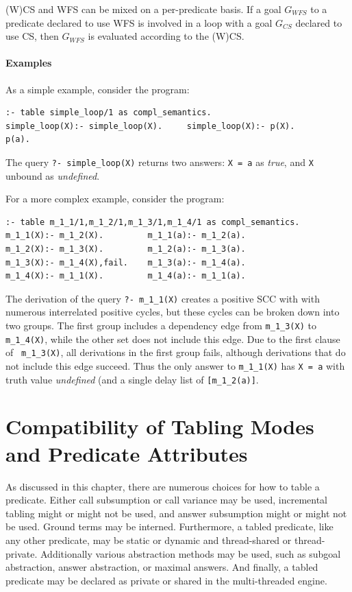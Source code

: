 (W)CS and WFS can be mixed on a per-predicate basis.  If a goal
$G_{WFS}$ to a predicate declared to use WFS is involved in a loop
with a goal $G_{CS}$ declared to use CS, then $G_{WFS}$ is evaluated
according to the (W)CS.

\paragraph{Examples}

As a simple example, consider the program:
\begin{verbatim}
:- table simple_loop/1 as compl_semantics.
simple_loop(X):- simple_loop(X).     simple_loop(X):- p(X).
p(a).
\end{verbatim}
The query {\tt ?- simple\_loop(X)} returns two answers: {\tt X = a} as
{\em true}, and {\tt X} unbound as {\em undefined}.

For a more complex example, consider the program:
\begin{verbatim}
:- table m_1_1/1,m_1_2/1,m_1_3/1,m_1_4/1 as compl_semantics.
m_1_1(X):- m_1_2(X).         m_1_1(a):- m_1_2(a).
m_1_2(X):- m_1_3(X).         m_1_2(a):- m_1_3(a).         
m_1_3(X):- m_1_4(X),fail.    m_1_3(a):- m_1_4(a).
m_1_4(X):- m_1_1(X).         m_1_4(a):- m_1_1(a).
\end{verbatim}
%
The derivation of the query {\tt ?- m\_1\_1(X)} creates a positive SCC
with with numerous interrelated positive cycles, but these cycles can
be broken down into two groups.  The first group includes a dependency
edge from {\tt m\_1\_3(X)} to {\tt m\_1\_4(X)}, while the other set
does not include this edge.  Due to the first clause of {\tt
  m\_1\_3(X)}, all derivations in the first group fails, although
derivations that do not include this edge succeed.  Thus the only
answer to {\tt m\_1\_1(X)} has {\tt X = a} with truth value {\em
  undefined} (and a single delay list of {\tt [m\_1\_2(a)]}.



\section{Compatibility of Tabling Modes and Predicate Attributes} \label{sec:tabling-compatibility}
%
As discussed in this chapter, there are numerous choices for how to
table a predicate. Either call subsumption or call variance may be
used, incremental tabling might or might not be used, and answer
subsumption might or might not be used.  Ground terms may be interned.
Furthermore, a tabled predicate, like any other predicate, may be
static or dynamic and thread-shared or thread-private.  Additionally
various abstraction methods may be used, such as subgoal abstraction,
answer abstraction, or maximal answers.  And finally, a tabled
predicate may be declared as private or shared in the multi-threaded
engine.  

